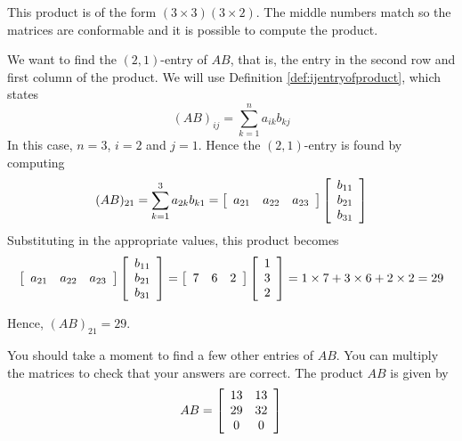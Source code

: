 \begin{solution} This product is of the form $\left( 3\times
3\right) \left( 3\times 2\right) $. The middle numbers match so the
matrices are conformable and it is possible to compute the product.  

We want to find the $\left( 2, 1 \right)$-entry of $AB$, that is, the entry in the second row and first column of the product.
We will use Definition \ref{def:ijentryofproduct}, which states 
\begin{equation*}
(AB)_{ij}=\sum_{k=1}^{n}a_{ik}b_{kj}
\end{equation*}
In this case, $n=3$, $i=2$ and $j=1$. Hence the $\left( 2, 1 \right)$-entry is found by computing
\begin{equation*}
 (AB)_{21} = \sum_{k=1}^{3}a_{2k}b_{k1} = 
 \left[
\begin{array}{ccc}
a_{21} & a_{22} & a_{23}
\end{array}
\right] \left[
\begin{array}{c}
b_{11} \\
b_{21} \\
b_{31}
\end{array}
\right]  
\end{equation*}
Substituting in the appropriate values, this product becomes
\begin{equation*}
\left[
\begin{array}{ccc}
a_{21} & a_{22} & a_{23}
\end{array}
\right] \left[
\begin{array}{c}
b_{11} \\
b_{21} \\
b_{31}
\end{array}
\right] 
=
\left[
\begin{array}{ccc}
7 & 6 & 2
\end{array}
\right] \left[
\begin{array}{c}
1 \\
3 \\
2
\end{array}
\right]
=
1 \times 7 + 3 \times 6 + 2 \times 2
=
29
\end{equation*}

Hence,  $(AB)_{21} = 29$.

You should take a moment to find a few other entries of $AB$. You can multiply the matrices to check that your answers are correct.
The product $AB$ is given by 
\begin{equation*}
AB = \left[
\begin{array}{cc}
13 & 13 \\
29 & 32 \\
0 & 0
\end{array}
\right] 
\end{equation*}
\end{solution}
